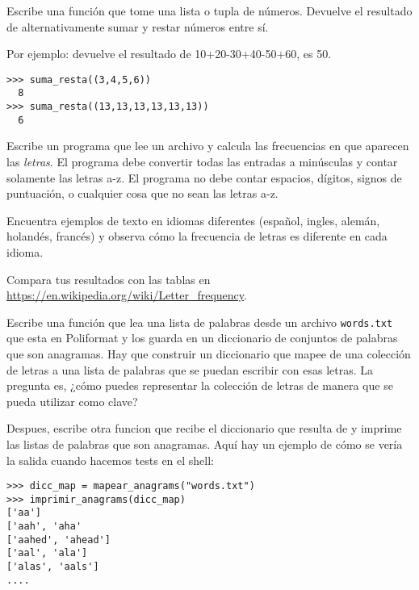 \begin{exercise}
Escribe una función  que tome una lista o tupla de números. Devuelve el resultado de alternativamente
sumar y restar números entre sí.

Por ejemplo:  devuelve el resultado de 10+20-30+40-50+60, es 50.

\begin{Verbatim}[frame=single, label = {\em example test runs}]
>>> suma_resta((3,4,5,6))
  8
>>> suma_resta((13,13,13,13,13,13))
  6
\end{Verbatim}



\end{exercise}


\begin{exercise}
Escribe un programa que lee un archivo y calcula las frecuencias en que aparecen las \emph{letras}. El programa debe
convertir todas las entradas a minúsculas y contar solamente las letras
a-z. El programa no debe contar espacios, dígitos, signos de puntuación,
o cualquier cosa que no sean las letras a-z. 

Encuentra ejemplos de texto
en idiomas diferentes (español, ingles, alemán, holandés, francés) y observa cómo la frecuencia de letras es diferente en cada idioma. 

Compara tus resultados con las tablas en
\url{https://en.wikipedia.org/wiki/Letter_frequency}.
\end{exercise}


\begin{exercise}
Escribe una función  que lea una lista de palabras desde un archivo \texttt{words.txt} que esta en Poliformat y los guarda en un diccionario de conjuntos de palabras que son anagramas. Hay que construir un diccionario que mapee de una
colección de letras a una lista de palabras que se puedan escribir con esas
letras.  La pregunta es, ¿cómo puedes representar la colección de
letras de manera que se pueda utilizar como clave?

Despues, escribe otra funcion  que recibe el diccionario que resulta de  y imprime las listas de palabras que son anagramas. Aquí hay un ejemplo de cómo se vería la salida cuando hacemos tests en el shell:

\begin{Verbatim}
>>> dicc_map = mapear_anagrams("words.txt")
>>> imprimir_anagrams(dicc_map)
['aa']
['aah', 'aha'
['aahed', 'ahead']
['aal', 'ala']
['alas', 'aals']
....
\end{Verbatim}
\end{exercise}

